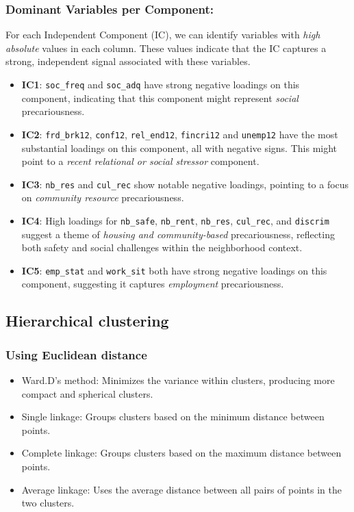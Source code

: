 \documentclass[
]{article}
\providecommand{\tightlist}{%
  \setlength{\itemsep}{0pt}\setlength{\parskip}{0pt}}\usepackage{longtable,booktabs,array}
\begin{document}
\subsubsection{Dominant Variables per
Component:}\label{dominant-variables-per-component}

For each Independent Component (IC), we can identify variables with
\emph{high absolute} values in each column. These values indicate that
the IC captures a strong, independent signal associated with these
variables.

\begin{itemize}
\item
  \textbf{IC1}: \texttt{soc\_freq} and \texttt{soc\_adq} have strong
  negative loadings on this component, indicating that this component
  might represent \emph{social} precariousness.
\item
  \textbf{IC2}: \texttt{frd\_brk12}, \texttt{conf12},
  \texttt{rel\_end12}, \texttt{fincri12} and \texttt{unemp12} have the
  most substantial loadings on this component, all with negative signs.
  This might point to a \emph{recent relational or social stressor}
  component.
\item
  \textbf{IC3}: \texttt{nb\_res} and \texttt{cul\_rec} show notable
  negative loadings, pointing to a focus on \emph{community resource}
  precariousness.
\item
  \textbf{IC4}: High loadings for \texttt{nb\_safe}, \texttt{nb\_rent},
  \texttt{nb\_res}, \texttt{cul\_rec}, and \texttt{discrim} suggest a
  theme of \emph{housing and community-based} precariousness, reflecting
  both safety and social challenges within the neighborhood context.
\item
  \textbf{IC5}: \texttt{emp\_stat} and \texttt{work\_sit} both have
  strong negative loadings on this component, suggesting it captures
  \emph{employment} precariousness.
\end{itemize}

\subsection{Hierarchical clustering}\label{hierarchical-clustering}

\subsubsection{Using Euclidean distance}\label{using-euclidean-distance}

\begin{itemize}
\tightlist
\item
  Ward.D's method: Minimizes the variance within clusters, producing
  more compact and spherical clusters.
\item
  Single linkage: Groups clusters based on the minimum distance between
  points.
\item
  Complete linkage: Groups clusters based on the maximum distance
  between points.
\item
  Average linkage: Uses the average distance between all pairs of points
  in the two clusters.
\end{itemize}
\end{document}
